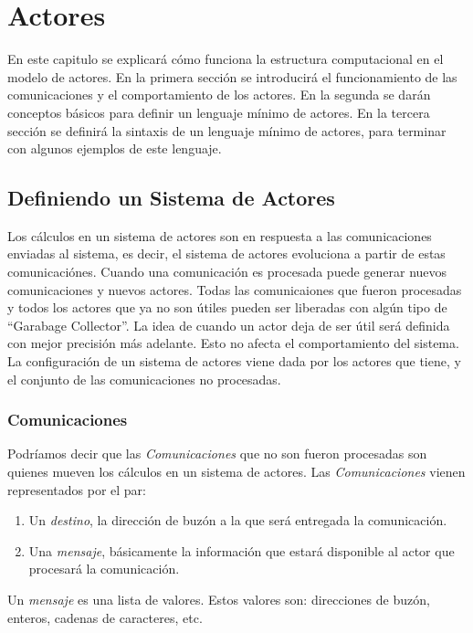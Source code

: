 \chapter{Actores}

En este capitulo se explicará cómo funciona la estructura computacional en el modelo de actores. En la primera sección se introducirá el funcionamiento de las comunicaciones y el comportamiento de los actores. En la segunda se darán conceptos básicos para definir un lenguaje mínimo de actores. En la tercera sección se definirá la sintaxis de un lenguaje mínimo de actores, para terminar con algunos ejemplos de este lenguaje.

\section{Definiendo un Sistema de Actores}

Los cálculos en un sistema de actores son en respuesta a las comunicaciones enviadas al sistema, es decir, el sistema de actores evoluciona a partir de estas comunicaciónes. Cuando una comunicación es procesada puede generar nuevos comunicaciones y nuevos actores. Todas las comunicaiones que fueron procesadas y todos los actores que ya no son útiles pueden ser liberadas con algún tipo de ``Garabage Collector''. La idea de cuando un actor deja de ser útil será definida con mejor precisión más adelante. Esto no afecta el comportamiento del sistema. La configuración de un sistema de actores viene dada por los actores que tiene, y el conjunto de las comunicaciones no procesadas. 

\subsection{Comunicaciones}

Podríamos decir que las \textit{Comunicaciones} que no son fueron procesadas son quienes mueven los cálculos en un sistema de actores. Las \textit{Comunicaciones} vienen representados por el par:

\begin{enumerate}
\item Un \textit{destino}, la dirección de buzón a la que será entregada la comunicación. 
\item Una \textit{mensaje}, básicamente la información que estará disponible al actor que procesará la comunicación.
\end{enumerate}

Un \textit{mensaje} es una lista de valores. Estos valores son: direcciones de buzón, enteros, cadenas de caracteres, etc. 

